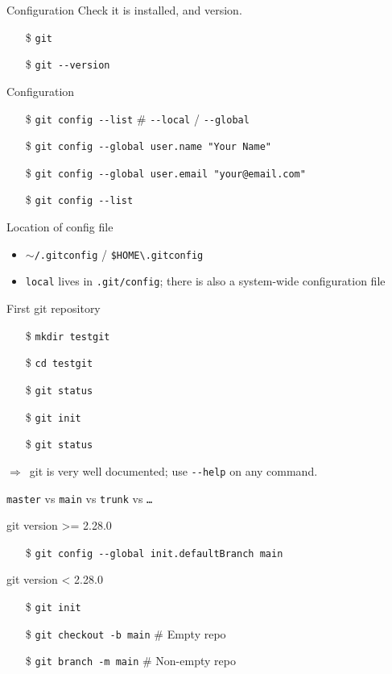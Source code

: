 \documentclass[aspectratio=169]{beamer}
\newcommand{\dra}{\ensuremath{\Rightarrow }~}
\newcommand{\code}[1]{\texttt{\color{mygreen}#1}}
\begin{document}
\begin{frame}
  {Configuration}
  Check it is installed, and version.
  \begin{itemize}
    \item[\$] \code{git}
    \item[\$] \code{git -{}-version}
  \end{itemize}

  Configuration
  \begin{itemize}
    \item[\$] \code{git config -{}-list}  \# \code{-{}-local} / \code{-{}-global}
    \item[\$] \code{git config -{}-global user.name "Your Name"}
    \item[\$] \code{git config -{}-global user.email "your@email.com"}
    \item[\$] \code{git config -{}-list}
  \end{itemize}

  Location of config file
  \begin{itemize}
    \item \code{$\sim$/.gitconfig} / \code{\$HOME\textbackslash .gitconfig}
    \item \code{local} lives in \code{.git/config};
    there is also a system-wide configuration file
  \end{itemize}
\end{frame}

\begin{frame}
  {First git repository}

  \begin{itemize}
    \item[\$] \code{mkdir testgit}
    \item[\$] \code{cd testgit}
    \item[\$] \code{git status}
    \item[\$] \code{git init}
    \item[\$] \code{git status}
  \end{itemize}

  \vfill

  \dra git is very well documented; use \code{-{}-help} on any command.

\end{frame}

\begin{frame}
  {\code{master} vs \code{main} vs \code{trunk} vs \code{\ldots}}

  git version >= 2.28.0
  \begin{itemize}
    \item[\$] \code{git config -{}-global init.defaultBranch main}
  \end{itemize}
  \vfill

  git version < 2.28.0
  \begin{itemize}
    \item[\$] \code{git init}
    \item[\$] \code{git checkout -b main}  \# Empty repo
    \item[\$] \code{git branch -m main}    \# Non-empty repo
  \end{itemize}
\end{frame}
\end{document}
